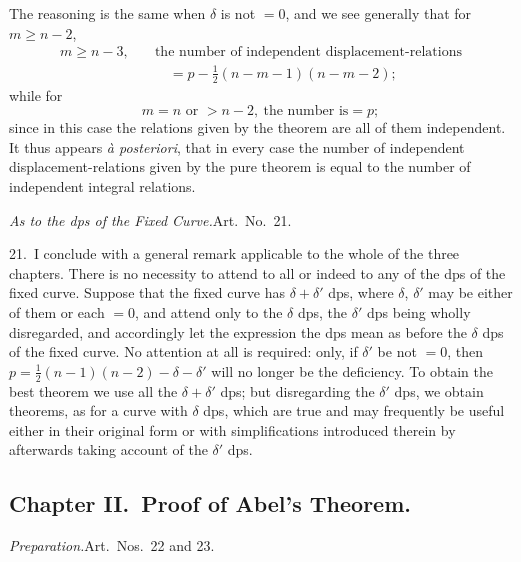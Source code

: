 \documentclass[11pt,a4paper]{article}
\theoremstyle{plain}
\theoremstyle{definition}
\theoremstyle{remark}
\begin{document}
The reasoning is the same when $\delta$ is not $= 0$, and we see generally that for $m \geq n - 2$,
\begin{align*}
m \geq n - 3, &\quad \text{the number of independent displacement-relations} \\
&\qquad = p - \tfrac{1}{2}(n - m - 1)(n - m - 2);
\end{align*}
while for
\[
m = n \text{ or } > n - 2,\ \text{the number is} = p;
\]
since in this case the relations given by the theorem are all of them independent. It thus appears \textit{\`a posteriori}, that in every case the number of independent displacement-relations given by the pure theorem is equal to the number of independent integral relations.

\textit{As to the dps of the Fixed Curve.}\quad Art.\ No.~21.

21.\ I conclude with a general remark applicable to the whole of the three chapters. There is no necessity to attend to all or indeed to any of the dps of the fixed curve. Suppose that the fixed curve has $\delta + \delta'$ dps, where $\delta$, $\delta'$ may be either of them or each $= 0$, and attend only to the $\delta$ dps, the $\delta'$ dps being wholly disregarded, and accordingly let the expression the dps mean as before the $\delta$ dps of the fixed curve. No attention at all is required: only, if $\delta'$ be not $= 0$, then $p = \tfrac{1}{2}(n - 1)(n - 2) - \delta - \delta'$ will no longer be the deficiency. To obtain the best theorem we use all the $\delta + \delta'$ dps; but disregarding the $\delta'$ dps, we obtain theorems, as for a curve with $\delta$ dps, which are true and may frequently be useful either in their original form or with simplifications introduced therein by afterwards taking account of the $\delta'$ dps.

\subsection*{Chapter II.\ Proof of Abel's Theorem.}

\textit{Preparation.}\quad Art.\ Nos.~22 and 23.
\end{document}
